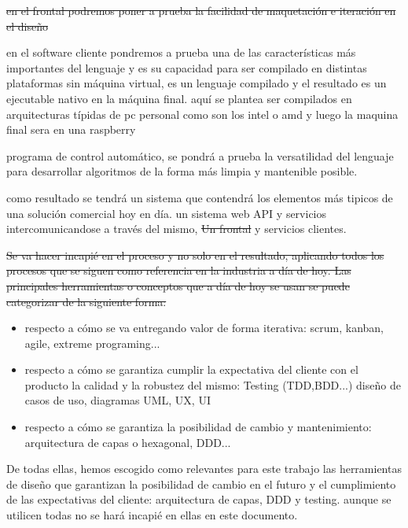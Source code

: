 \sout{en el frontal podremos poner a prueba la facilidad de maquetación e iteración en el diseño}


en el software cliente pondremos a prueba una de las características más importantes del lenguaje y es su capacidad para ser compilado en distintas plataformas sin máquina virtual, es un lenguaje compilado y el resultado es un ejecutable nativo en la máquina final. aquí se plantea ser compilados en arquitecturas típidas de pc personal como son los intel o amd y luego la maquina final sera en una raspberry 


programa de control automático, se pondrá a prueba la versatilidad del lenguaje para desarrollar algoritmos de la forma más limpia y mantenible posible.


como resultado se tendrá un sistema que contendrá los elementos más tipicos de una solución comercial hoy en día. un sistema web API y servicios intercomunicandose a través del mismo, \sout{Un frontal} y servicios clientes.


\sout{Se va hacer incapié en el proceso y no solo en el resultado, aplicando todos los procesos que se siguen como referencia en la industria a día de hoy.  Las principales herramientas o conceptos que a día de hoy se usan se puede categorizar de la siguiente forma:
}
\begin{itemize}
	\item respecto a cómo se va entregando valor de forma iterativa: scrum, kanban, agile, extreme programing...
	\item respecto a cómo se garantiza cumplir la expectativa del cliente con el producto la calidad y la robustez del mismo: Testing (TDD,BDD...) diseño de casos de uso, diagramas UML, UX, UI
	\item respecto a cómo se garantiza la posibilidad de cambio y mantenimiento: arquitectura de capas o hexagonal, DDD... 
\end{itemize} 

De todas ellas, hemos escogido como relevantes para este trabajo las herramientas de diseño que garantizan la posibilidad de cambio en el futuro y el cumplimiento de las expectativas del cliente: arquitectura de capas, DDD y testing. aunque se utilicen todas no se hará incapié en ellas en este documento.


